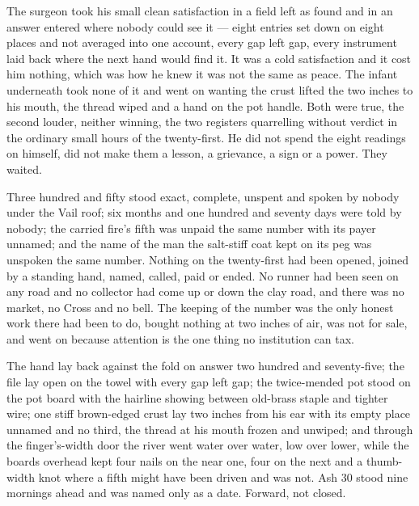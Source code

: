 The surgeon took his small clean satisfaction in a field left as found and in an answer entered where nobody could see it --- eight entries set down on eight places and not averaged into one account, every gap left gap, every instrument laid back where the next hand would find it. It was a cold satisfaction and it cost him nothing, which was how he knew it was not the same as peace. The infant underneath took none of it and went on wanting the crust lifted the two inches to his mouth, the thread wiped and a hand on the pot handle. Both were true, the second louder, neither winning, the two registers quarrelling without verdict in the ordinary small hours of the twenty-first. He did not spend the eight readings on himself, did not make them a lesson, a grievance, a sign or a power. They waited.

Three hundred and fifty stood exact, complete, unspent and spoken by nobody under the Vail roof; six months and one hundred and seventy days were told by nobody; the carried fire's fifth was unpaid the same number with its payer unnamed; and the name of the man the salt-stiff coat kept on its peg was unspoken the same number. Nothing on the twenty-first had been opened, joined by a standing hand, named, called, paid or ended. No runner had been seen on any road and no collector had come up or down the clay road, and there was no market, no Cross and no bell. The keeping of the number was the only honest work there had been to do, bought nothing at two inches of air, was not for sale, and went on because attention is the one thing no institution can tax.

The hand lay back against the fold on answer two hundred and seventy-five; the file lay open on the towel with every gap left gap; the twice-mended pot stood on the pot board with the hairline showing between old-brass staple and tighter wire; one stiff brown-edged crust lay two inches from his ear with its empty place unnamed and no third, the thread at his mouth frozen and unwiped; and through the finger's-width door the river went water over water, low over lower, while the boards overhead kept four nails on the near one, four on the next and a thumb-width knot where a fifth might have been driven and was not. Ash 30 stood nine mornings ahead and was named only as a date. Forward, not closed.
